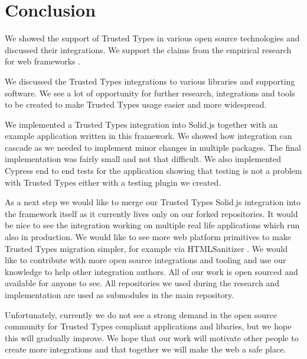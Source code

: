 \chapter{Conclusion}


We showed the support of Trusted Types in various open source technologies and discussed their
integrations. We support the claims from the empirical research for web frameworks
\cite{tt_web_framework_paper}.

We discussed the Trusted Types integrations to various libraries and supporting software. We see a
lot of opportunity for further research, integrations and tools to be created to make Trusted Types
usage easier and more widespread.

We implemented a Trusted Types integration into Solid.js together with an example application
written in this framework. We showed how integration can cascade as we needed to implement minor
changes in multiple packages. The final implementation was fairly small and not that difficult. We
also implemented Cypress end to end tests for the application showing that testing is not a problem
with Trusted Types either with a testing plugin we created.

As a next step we would like to merge our Trusted Types Solid.js integration into the framework
itself as it currently lives only on our forked repositories. It would be nice to see the
integration working on multiple real life applications which run also in production. We would like
to see more web platform primitives to make Trusted Types migration simpler, for example via
HTMLSanitizer \cite{tt_report_mid2021}. We would like to contribute with more open source
integrations and tooling and use our knowledge to help other integration authors. All of our work is
open sourced and available for anyone to see. All repositories we used during the research and
implementation are used as submodules in the main repository.

Unfortunately, currently we do not see a strong demand in the open source community for Trusted
Types compliant applications and libaries, but we hope this will gradually improve. We hope that our
work will motivate other people to create more integrations and that together we will make the web a
safe place.
